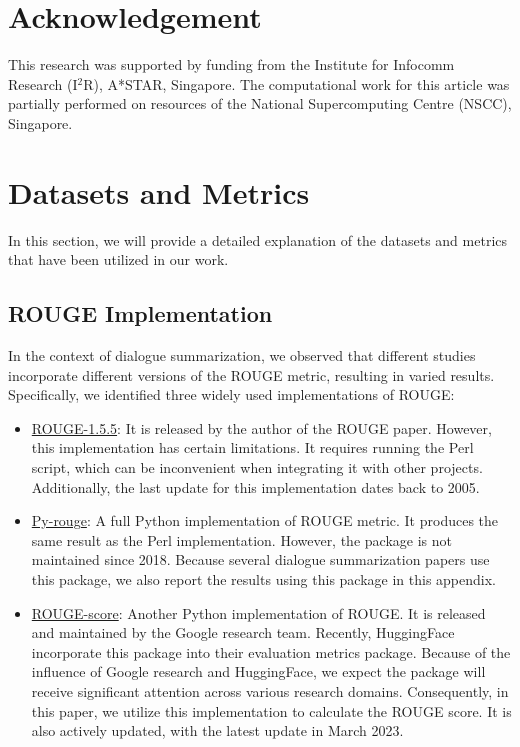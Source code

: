 \documentclass[11pt]{article}
\begin{document}
\section*{Acknowledgement}

    This research was supported by funding from the Institute for Infocomm Research (I$^2$R), A*STAR, Singapore. The computational work for this article was partially performed on resources of the National Supercomputing Centre (NSCC), Singapore.





\appendix

\section{Datasets and Metrics}

    In this section, we will provide a detailed explanation of the datasets and metrics that have been utilized in our work.
    
    \subsection{ROUGE Implementation}
    \label{sec:rouge_implementation}

    In the context of dialogue summarization, we observed that different studies incorporate different versions of the ROUGE metric, resulting in varied results. Specifically, we identified three widely used implementations of ROUGE:
    
        \begin{itemize}
            \item \href{https://github.com/andersjo/pyrouge/blob/master/tools/ROUGE-1.5.5/ROUGE-1.5.5.pl}{ROUGE-1.5.5}: It is released by the author of the ROUGE paper. However, this implementation has certain limitations. It requires running the Perl script, which can be inconvenient when integrating it with other projects. Additionally, the last update for this implementation dates back to 2005.
            \item \href{https://pypi.org/project/py-rouge/}{Py-rouge}: A full Python implementation of ROUGE metric. It produces the same result as the Perl implementation. However, the package is not maintained since 2018. Because several dialogue summarization papers use this package, we also report the results using this package in this appendix.
            \item \href{https://github.com/google-research/google-research/tree/master/rouge}{ROUGE-score}: Another Python implementation of ROUGE. It is released and maintained by the Google research team. Recently, HuggingFace incorporate this package into their evaluation metrics package. Because of the influence of Google research and HuggingFace, we expect the package will receive significant attention across various research domains. Consequently, in this paper, we utilize this implementation to calculate the ROUGE score. It is also actively updated, with the latest update in March 2023.
        \end{itemize}
        
\end{document}
